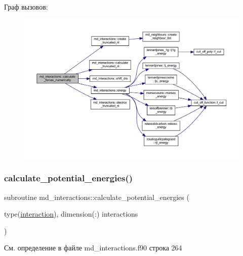 Граф вызовов\+:\nopagebreak
\begin{figure}[H]
\begin{center}
\leavevmode
\includegraphics[width=350pt]{namespacemd__interactions_a49c070421fed83b68f06a9b8b7f92048_cgraph}
\end{center}
\end{figure}
\mbox{\label{namespacemd__interactions_a846dbc2db901133c72ff58afb321e918}} 
\subsubsection{\texorpdfstring{calculate\+\_\+potential\+\_\+energies()}{calculate\_potential\_energies()}}
{\footnotesize\ttfamily subroutine md\+\_\+interactions\+::calculate\+\_\+potential\+\_\+energies (\begin{DoxyParamCaption}\item[{type(\mbox{\hyperlink{structmd__interactions_1_1interaction}{interaction}}), dimension(\+:)}]{interactions }\end{DoxyParamCaption})}



См. определение в файле md\+\_\+interactions.\+f90 строка 264


